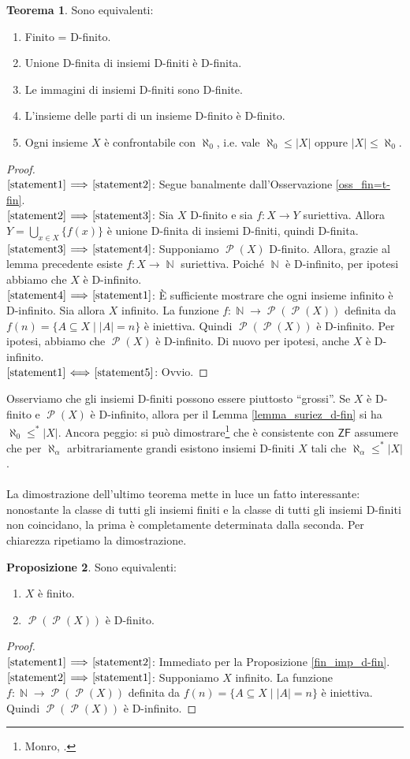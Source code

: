 \documentclass[12pt,a4paper]{report}
\theoremstyle{definition}
\newtheorem{teo}{Teorema}[section]  %
\newtheorem{prop}[teo]{Proposizione}  %
\theoremstyle{num.custom-title}
\DeclareMathOperator{\PP}{\mathcal{P}}
\DeclareMathOperator{\N}{\mathbb{N}}
\newcommand{\ZF}{\ensuremath{\mathsf{ZF}}\xspace}
\newcommand{\Implies}[2]{$\text{\ref{statement#1}}\!\implies\!\text{\ref{statement#2}}$}%
\newcommand{\punto}[1]{\item \label{statement#1}}
\newenvironment{equivalence}
    {\begin{enumerate}[label=(\arabic*),ref=(\arabic*)]
    }
    { 
	\end{enumerate}
    }
\begin{document}
\begin{teo}\label{caratt_fin=d-fin} Sono equivalenti:
\begin{equivalence}
\punto{1} Finito = D-finito.
\punto{2} Unione D-finita di insiemi D-finiti è D-finita.
\punto{3} Le immagini di insiemi D-finiti sono D-finite.
\punto{4} L'insieme delle parti di un insieme D-finito è D-finito.
\punto{5} Ogni insieme $X$ è confrontabile con $\aleph_0$, i.e. vale $\aleph_0 \leq |X|$ oppure $|X| \leq \aleph_0$.
\end{equivalence}
\begin{proof} \ \\
\Implies{1}{2}: Segue banalmente dall'Osservazione \ref{oss_fin=t-fin}.\\
\Implies{2}{3}: Sia $X$ D-finito e sia $f: X \to Y$ suriettiva. Allora $Y=\bigcup_{x \in X} \{f(x)\}$ è unione D-finita di insiemi D-finiti, quindi D-finita.\\
\Implies{3}{4}: Supponiamo $\PP(X)$ D-finito. Allora, grazie al lemma precedente esiste $f: X \to \N$ suriettiva. Poiché $\N$ è D-infinito, per ipotesi abbiamo che $X$ è D-infinito.\\
\Implies{4}{1}: È sufficiente mostrare che ogni insieme infinito è D-infinito. Sia allora $X$ infinito. La funzione $f: \N \to \PP(\PP(X))$ definita da $f(n)=\{A \subseteq X \mid |A|=n\}$ è iniettiva. Quindi $\PP(\PP(X))$ è D-infinito. Per ipotesi, abbiamo che $\PP(X)$ è D-infinito. Di nuovo per ipotesi, anche $X$ è D-infinito.\\
$\text{\ref{statement1}}\!\iff\!\text{\ref{statement5}}$: Ovvio.
\end{proof}
\end{teo}

Osserviamo che gli insiemi D-finiti possono essere piuttosto ``grossi''. Se $X$ è D-finito e $\PP(X)$ è D-infinito, allora per il Lemma \ref{lemma_suriez_d-fin} si ha $\aleph_0 \leq^* |X|$. Ancora peggio: si può dimostrare\footnote{Monro, \cite{Mon75:Herrlich}.} che è consistente con \ZF assumere che per $\aleph_\alpha$ arbitrariamente grandi esistono insiemi D-finiti $X$ tali che $\aleph_\alpha \leq^* |X|$.\\
\\
La dimostrazione dell'ultimo teorema mette in luce un fatto interessante: nonostante la classe di tutti gli insiemi finiti e la classe di tutti gli insiemi D-finiti non coincidano, la prima è completamente determinata dalla seconda. Per chiarezza ripetiamo la dimostrazione.

\begin{prop}\label{prop_P(P(X))} Sono equivalenti:
\begin{equivalence}
\punto{1} $X$ è finito.
\punto{2} $\PP(\PP(X))$ è D-finito.
\end{equivalence}
\begin{proof}\ \\
\Implies{1}{2}: Immediato per la Proposizione \ref{fin_imp_d-fin}.\\
\Implies{2}{1}: Supponiamo $X$ infinito. La funzione $f: \N \to \PP(\PP(X))$ definita da $f(n)=\{A \subseteq X \mid |A|=n\}$ è iniettiva. Quindi $\PP(\PP(X))$ è D-infinito.
\end{proof}
\end{prop}
\end{document}
